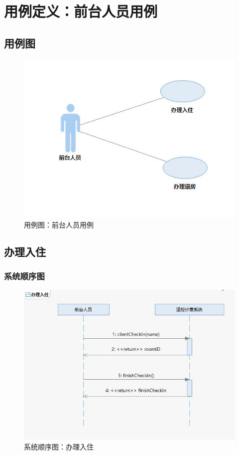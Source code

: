 \documentclass[black,normal,cn]{elegantnote}
\begin{document}
\section{用例定义：前台人员用例}

\subsection{用例图}

\begin{figure}[H]
    \centering
    \includegraphics[width=.5\textwidth]{fig/268001.png}
    \caption{用例图：前台人员用例}
    \label{fig:268001}
\end{figure}


\subsection{办理入住}

\subsubsection{系统顺序图}

\begin{figure}[H]
    \centering
    \includegraphics[width=.8\textwidth]{fig/268002.png}
    \caption{系统顺序图：办理入住}
    \label{fig:268002}
\end{figure}
\end{document}
